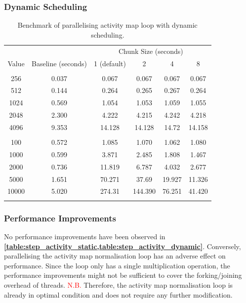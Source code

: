 \documentclass[12pt, a4paper]{article}
\let\oldcref\cref
\renewcommand{\cref}[1]{\textbf{\oldcref{#1}}}
\begin{document}
\subsubsection{Dynamic Scheduling}
\renewcommand{\arraystretch}{1.3}
\begin{longtable}{|c|c|c|c|c|c|}
  \hline \endfirsthead
  & & \multicolumn{4}{c|}{Chunk Size (seconds)} \\
  \cline{3-6}
  \multirow{-2}{*}{Value} & \multirow{-2}{*}{Baseline (seconds)}
  & 1 (default) & 2 & 4 & 8 \\ \hline
  \rowcolor{lightgray} \multicolumn{6}{|c|}{\textbf{Number of Bodies (N)}} \\ \hline
  256  & \cellcolor{green}0.037 & 0.067 & 0.067 & 0.067 & 0.067 \\
  512  & \cellcolor{green}0.144 & 0.264 & 0.265 & 0.267 & 0.264 \\
  1024 & \cellcolor{green}0.569 & 1.054 & 1.053 & 1.059 & 1.055 \\
  2048 & \cellcolor{green}2.300 & 4.222 & 4.215 & 4.242 & 4.218 \\
  4096 & \cellcolor{green}9.353 & 14.128 & 14.128 & 14.72 & 14.158 \\ \hline
  \rowcolor{lightgray} \multicolumn{6}{|c|}{\textbf{Activity Grid Dimension (D)}} \\ \hline
  100   & \cellcolor{green}0.572 & 1.085 & 1.070 & 1.062 & 1.080 \\
  1000  & \cellcolor{green}0.599 & 3.871 & 2.485 & 1.808 & 1.467 \\
  2000  & \cellcolor{green}0.736 & 11.819 & 6.787 & 4.032 & 2.677 \\
  5000  & \cellcolor{green}1.651 & 70.271 & 37.69 & 19.927 & 11.326 \\
  10000 & \cellcolor{green}5.020 & 274.31 & 144.390 & 76.251 & 41.420 \\ \hline
  \caption{Benchmark of parallelising activity map loop with dynamic scheduling.}
  \label{table:step_activity_dynamic}
\end{longtable}
\renewcommand{\arraystretch}{1}

\subsubsection{Performance Improvements}
No performance improvements have been observed in
\cref{table:step_activity_static,table:step_activity_dynamic}. Conversely, parallelising the
activity map normalisation loop has an adverse effect on performance. Since the loop only has a
single multiplication operation, the performance improvements might not be sufficient to cover the
forking/joining overhead of threads. \textcolor{red}{N.B.} Therefore, the activity map normalisation
loop is already in optimal condition and does not require any further modification.
\end{document}
